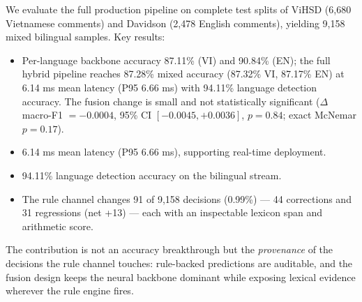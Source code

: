 We evaluate the full production pipeline on complete test splits of ViHSD
(6{,}680 Vietnamese comments) and Davidson (2{,}478 English comments), yielding
9{,}158 mixed bilingual samples.  Key results:
\begin{itemize}
    \item Per-language backbone accuracy 87.11\% (VI) and 90.84\% (EN); the full
          hybrid pipeline reaches 87.28\% mixed accuracy (87.32\% VI, 87.17\% EN)
          at 6.14 ms mean latency (P95 6.66 ms) with 94.11\% language detection
          accuracy.  The fusion change is small and not statistically significant
          ($\Delta$macro-F1 $=-0.0004$, 95\% CI $[-0.0045,+0.0036]$, $p=0.84$;
          exact McNemar $p=0.17$).
    \item 6.14 ms mean latency (P95 6.66 ms), supporting real-time deployment.
    \item 94.11\% language detection accuracy on the bilingual stream.
    \item The rule channel changes 91 of 9{,}158 decisions (0.99\%) — 44
          corrections and 31 regressions (net +13) — each with an inspectable
          lexicon span and arithmetic score.
\end{itemize}

The contribution is not an accuracy breakthrough but the \emph{provenance} of
the decisions the rule channel touches: rule-backed predictions are auditable,
and the fusion design keeps the neural backbone dominant while exposing
lexical evidence wherever the rule engine fires.

